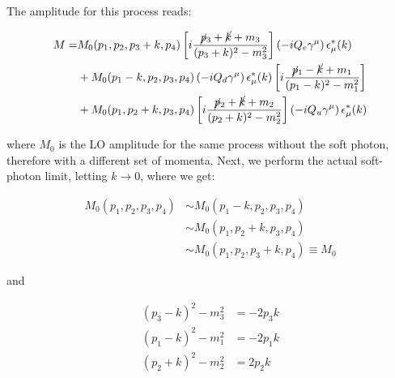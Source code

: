 \documentclass{report}
\begin{document}
\begin{center}
\end{center}

The amplitude for this process reads:

\begin{align}
    M =& M_0(p_1,p_2,p_3+k,p_4)\left[i\frac{\cancel{p}_3+\cancel{k}+m_3}{(p_3+k)^2-m_3^2}\right]\left(-iQ_e\gamma^\mu\right)\epsilon_\mu^*(k) \nonumber \\
    &+ M_0(p_1-k,p_2,p_3,p_4)\left(-iQ_d\gamma^\mu\right)\epsilon_\mu^*(k)\left[i\frac{\cancel{p}_1-\cancel{k}+m_1}{(p_1-k)^2-m_1^2}\right] \nonumber \\
    &+ M_0(p_1,p_2+k,p_3,p_4)\left[i\frac{\cancel{p}_2+\cancel{k}+m_2}{(p_2+k)^2-m_2^2}\right]\left(-iQ_u\gamma^\mu\right)\epsilon_\mu^*(k)
\end{align}


where $M_0$ is the LO amplitude for the same process without the soft photon, therefore with a different set of momenta. Next, we perform the actual soft-photon limit, letting $k\to 0$, where we get:

\begin{align}
    M_0(p_1,p_2,p_3,p_4) &\sim M_0(p_1-k,p_2,p_3,p_4) \nonumber \\
    &\sim M_0(p_1,p_2+k,p_3,p_4) \nonumber \\
    &\sim M_0(p_1,p_2,p_3+k,p_4) \equiv M_0 
\end{align}

and 

\begin{align}
    (p_3-k)^2-m_3^2 &= -2p_3k \\
    (p_1-k)^2-m_1^2 &= -2p_1k \\
    (p_2+k)^2-m_2^2 &= 2p_2k
\end{align}
\end{document}
